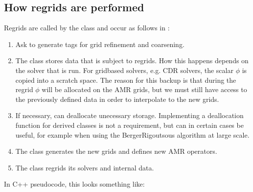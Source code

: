 \documentclass[letterpaper,10pt,english]{sphinxmanual}
\begin{document}
\subsection{How regrids are performed}
\label{\detokenize{Driver:how-regrids-are-performed}}
Regrids are called by the  class and occur as follows in :
\begin{enumerate}
%
\item {} 
Ask  to generate tags for grid refinement and coarsening.

\item {} 
The  class stores data that is subject to regrids.
How this happens depends on the solver that is run.
For grid\sphinxhyphen{}based solvers, e.g. CDR solvers, the scalar \(\phi\) is copied into a scratch space.
The reason for this backup is that during the regrid \(\phi\) will be allocated on the  AMR grids, but we must still have access to the previously defined data in order to interpolate to the new grids.

\item {} 
If necessary,  can deallocate unecessary storage.
Implementing a deallocation function for \sphinxhyphen{}derived classes is not a requirement, but can in certain cases be useful, for example when using the Berger\sphinxhyphen{}Rigoutsous algorithm at large scale.

\item {} 
The  class generates the new grids and defines new AMR operators.

\item {} 
The  class regrids its solvers and internal data.

\end{enumerate}

In C++ pseudo\sphinxhyphen{}code, this looks something like:
\end{document}
